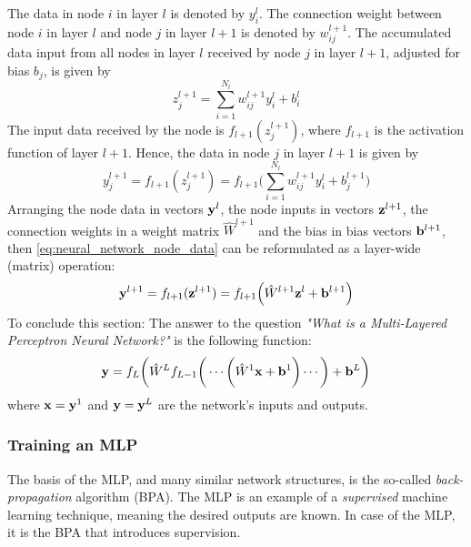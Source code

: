 \documentclass[nofootinbib,reprint,english]{revtex4-1}
\begin{document}
The data in node \(i\) in layer \(l\) is denoted by \(y_i^l\). The connection weight between node \(i\) in layer \(l\) and node \(j\) in layer \(l+1\) is denoted by \(w_{ij}^{l+1}\). The accumulated data input from all nodes in layer \(l\) received by node \(j\) in layer \(l+1\), adjusted for bias \(b_j\), is given by
\begin{equation}\label{eq:neural_network_node_received_data}
z_j^{l+1}=\sum_{i=1}^{N_l}w_{ij}^{l+1}y_i^l+b_i^l
\end{equation}
The input data received by the node is \(f_{l+1}(z_j^{l+1})\), where \(f_{l+1}\) is the activation function of layer \(l+1\). Hence, the data in node \(j\) in layer \(l+1\) is given by
\begin{equation}\label{eq:neural_network_node_data}
y_j^{l+1}=f_{l+1}(z_j^{l+1})=f_{l+1}\Bigg(\sum_{i=1}^{N_l}w_{ij}^{l+1}y_i^l+b_j^{l+1}\Bigg)
\end{equation}
Arranging the node data in vectors \(\vb{y}^l\), the node inputs in vectors \(\vb{z}^{l+1}\), the connection weights in a weight matrix \(\hat{W}^{l+1}\) and the bias in bias vectors \(\vb{b}^{l+1}\), then \eqref{eq:neural_network_node_data} can be reformulated as a layer-wide (matrix) operation:
\begin{equation}\label{eq:neural_network_layer_input}
\vb{y}^{l+1}=f_{l+1}(\vb{z}^{l+1})=f_{l+1}\Big(\hat{W}^{l+1}\vb{z}^l+\vb{b}^{l+1}\Big)
\end{equation}
To conclude this section: The answer to the question \emph{"What is a Multi-Layered Perceptron Neural Network?"} is the following function:
\begin{equation}\label{eq:equation_of_neural_network}
\vb{y}=f_L\bigg(\hat{W}^Lf_{L-1}\bigg(\cdots \bigg(\hat{W}^1\vb{x}+\vb{b}^1\bigg)\cdots\bigg)+\vb{b}^L\bigg)
\end{equation}
where \(\vb{x}=\vb{y}^1\) and \(\vb{y}=\vb{y}^L\) are the network's inputs and outputs.
\subsubsection{Training an MLP}
The basis of the MLP, and many similar network structures, is the so-called \emph{back-propagation} algorithm (BPA). The MLP is an example of a \emph{supervised} machine learning technique, meaning the desired outputs are known. In case of the MLP, it is the BPA that introduces supervision.
\end{document}
